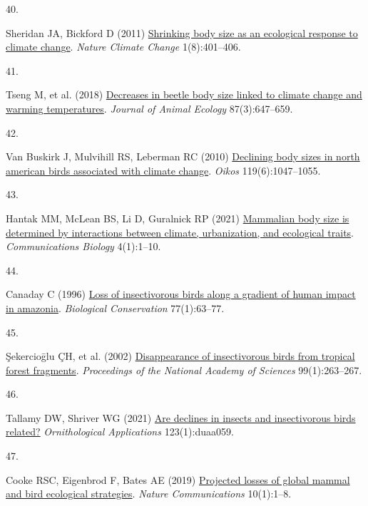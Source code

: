 \documentclass{article}
\newlength{\cslhangindent}
\newlength{\csllabelwidth}
\newlength{\cslentryspacingunit} %
\newenvironment{CSLReferences}[2] %
 {%
  \setlength{\parindent}{0pt}
  \ifodd #1
  \let\oldpar\par
  \def\par{\hangindent=\cslhangindent\oldpar}
  \fi
  \setlength{\parskip}{#2\cslentryspacingunit}
 }%
 {}
\newcommand{\CSLLeftMargin}[1]{\parbox[t]{\csllabelwidth}{#1}}
\newcommand{\CSLRightInline}[1]{\parbox[t]{\linewidth - \csllabelwidth}{#1}\break}
\begin{document}
\begin{CSLReferences}{0}{0}
\leavevmode{}%
\CSLLeftMargin{40. }%
\CSLRightInline{Sheridan JA, Bickford D (2011)
\href{https://doi.org/10.1038/nclimate1259}{Shrinking body size as an
ecological response to climate change}. \emph{Nature Climate Change}
1(8):401--406.}

\leavevmode{}%
\CSLLeftMargin{41. }%
\CSLRightInline{Tseng M, et al. (2018)
\href{https://doi.org/10.1111/1365-2656.12789}{Decreases in beetle body
size linked to climate change and warming temperatures}. \emph{Journal
of Animal Ecology} 87(3):647--659.}

\leavevmode{}%
\CSLLeftMargin{42. }%
\CSLRightInline{Van Buskirk J, Mulvihill RS, Leberman RC (2010)
\href{https://www.jstor.org/stable/25700339}{Declining body sizes in
north american birds associated with climate change}. \emph{Oikos}
119(6):1047--1055.}

\leavevmode{}%
\CSLLeftMargin{43. }%
\CSLRightInline{Hantak MM, McLean BS, Li D, Guralnick RP (2021)
\href{https://doi.org/10.1038/s42003-021-02505-3}{Mammalian body size is
determined by interactions between climate, urbanization, and ecological
traits}. \emph{Communications Biology} 4(1):1--10.}

\leavevmode{}%
\CSLLeftMargin{44. }%
\CSLRightInline{Canaday C (1996)
\href{https://doi.org/10.1016/0006-3207(95)00115-8}{Loss of
insectivorous birds along a gradient of human impact in amazonia}.
\emph{Biological Conservation} 77(1):63--77.}

\leavevmode{}%
\CSLLeftMargin{45. }%
\CSLRightInline{Şekercioḡlu ÇH, et al. (2002)
\href{https://doi.org/10.1073/pnas.012616199}{Disappearance of
insectivorous birds from tropical forest fragments}. \emph{Proceedings
of the National Academy of Sciences} 99(1):263--267.}

\leavevmode{}%
\CSLLeftMargin{46. }%
\CSLRightInline{Tallamy DW, Shriver WG (2021)
\href{https://doi.org/10.1093/ornithapp/duaa059}{Are declines in insects
and insectivorous birds related?} \emph{Ornithological Applications}
123(1):duaa059.}

\leavevmode{}%
\CSLLeftMargin{47. }%
\CSLRightInline{Cooke RSC, Eigenbrod F, Bates AE (2019)
\href{https://doi.org/10.1038/s41467-019-10284-z}{Projected losses of
global mammal and bird ecological strategies}. \emph{Nature
Communications} 10(1):1--8.}


\end{CSLReferences}
\end{document}
